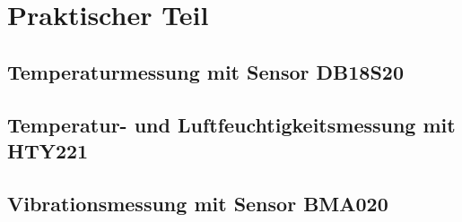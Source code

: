 \chapter{Praktischer Teil}

\section{Temperaturmessung mit Sensor DB18S20}
\label{section_DB18S20}

\section{Temperatur- und Luftfeuchtigkeitsmessung mit HTY221}
\label{section_HTY221}

\section{Vibrationsmessung mit Sensor BMA020}
\label{section_BMA020}